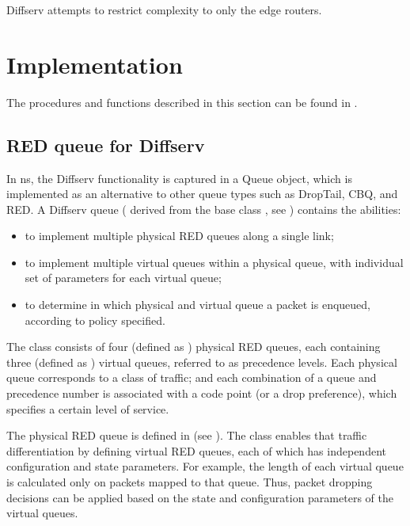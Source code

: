Diffserv attempts to restrict complexity to only the edge routers.


\section{Implementation}
\label{sec:diffservimplement}

The procedures and functions described in this section can be found in
.

\subsection{RED queue for Diffserv}
\label{sec:dsredq}

In ns, the Diffserv functionality is captured in a Queue object, which is 
implemented as an alternative to other queue types such as DropTail, CBQ, and 
RED.  A Diffserv queue ( derived from the base class 
, see ) contains the abilities:

\begin{itemize}
\item
to implement multiple physical RED queues along a single link;
\item
to implement multiple virtual queues within a physical queue, with 
individual set of parameters for each virtual queue;
\item
to determine in which physical and virtual queue a packet is enqueued, 
according to policy specified.
\end{itemize}

The class  consists of four (defined as ) 
physical RED queues,
each containing three (defined as ) virtual queues, 
referred to as precedence levels. Each physical queue corresponds to a class of
traffic; and each combination of a queue and precedence number is associated 
with a code point (or a drop preference), which specifies a certain level of 
service.

The physical RED queue is defined in  
(see ). 
The  class enables that traffic differentiation by defining 
virtual RED queues, each of which has independent configuration and state 
parameters. 
For example, the length of each virtual queue is calculated only on packets 
mapped to that queue.  Thus, packet dropping decisions can be applied based on 
the state and configuration parameters of the virtual queues.


